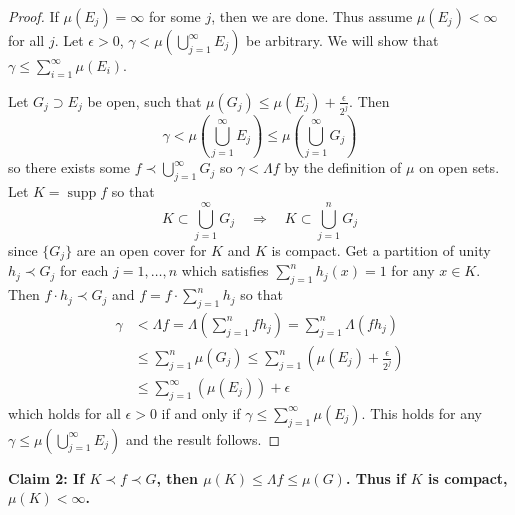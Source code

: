 \documentclass[12pt, a4paper]{book}
\DeclareMathOperator{\supp}{supp}
\newcommand{\imp}{\ensuremath{\quad\Longrightarrow\quad}}
\theoremstyle{nonumberplain}
\newtheorem{proof}{Proof}
\begin{document}
\begin{proof}
    If $\mu(E_j)=\infty$ for some $j$, then we are done.
    Thus assume $\mu(E_j)<\infty$ for all $j$.
    Let $\epsilon>0$, $\gamma<\mu\left(\bigcup_{j=1}^\infty E_j\right)$ be arbitrary.
    We will show that $\gamma\leq\sum_{i=1}^\infty \mu(E_i)$.

    Let $G_j\supset E_j$ be open, such that $\mu(G_j)\leq\mu(E_j)+\frac{\epsilon}{2^j}$.
    Then
    \[\gamma<\mu\left(\bigcup\limits_{j=1}^\infty E_j\right)\leq \mu\left(\bigcup\limits_{j=1}^\infty G_j\right)\]
    so there exists some $f\prec \bigcup_{j=1}^\infty G_j$ so $\gamma<\Lambda f$ by the definition of $\mu$ on open sets.
    Let $K=\supp f$ so that
    \[K\subset\bigcup\limits_{j=1}^\infty G_j\imp K\subset\bigcup\limits_{j=1}^n G_j\]
    since $\{G_j\}$ are an open cover for $K$ and $K$ is compact.
    Get a partition of unity $h_j\prec G_j$ for each $j=1,\ldots,n$ which satisfies $\sum_{j=1}^n h_j(x)=1$ for any $x\in K$.
    Then $f\cdot h_j\prec G_j$ and $f=f\cdot\sum_{j=1}^n h_j$ so that
    \begin{align*}
        \gamma &<\Lambda f=\Lambda\left(\sum\limits_{j=1}^n fh_j\right)=\sum\limits_{j=1}^n\Lambda(fh_j)\\
               &\leq \sum\limits_{j=1}^n \mu(G_j)\leq \sum\limits_{j=1}^n\left(\mu(E_j)+\frac{\epsilon}{2^j}\right)\\
               &\leq \sum\limits_{j=1}^\infty\left(\mu(E_j)\right)+\epsilon
    \end{align*}
    which holds for all $\epsilon>0$ if and only if $\gamma\leq\sum_{j=1}^\infty\mu(E_j)$.
    This holds for any $\gamma\leq\mu\left(\bigcup_{j=1}^\infty E_j\right)$ and the result follows.
\end{proof}
\textbf{Claim 2:
    If $K\prec f\prec G$, then $\mu(K)\leq\Lambda f\leq\mu(G)$.
    Thus if $K$ is compact, $\mu(K)<\infty$.
}
\end{document}
